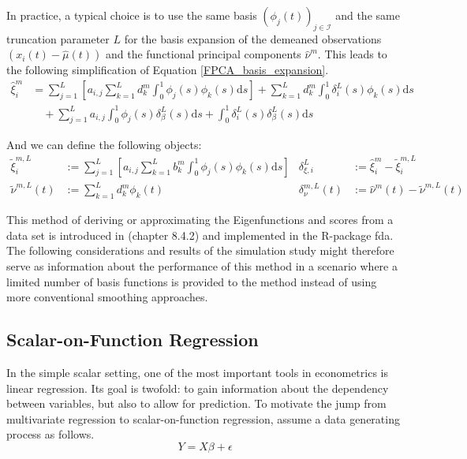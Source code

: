 \documentclass[11pt,twoside,a4paper]{article}
\begin{document}
	In practice, a typical choice is to use the same basis $\left(\phi_j(t)\right)_{j \in \mathcal{I}}$ and the same truncation parameter $L$ for the basis expansion of the demeaned observations $\left(x_i(t) - \hat{\mu}(t)\right)$ and the functional principal components $\hat{\nu}^m$. This leads to the following simplification of Equation \ref{FPCA_basis_expansion}.
	\begin{equation}\label{score_approx}
		\begin{split}
			\hat{\xi}_{i}^m &= \sum_{j = 1}^{L} \left[a_{i,j}\sum_{k = 1}^{L} d_{k}^m \int_{0}^{1} \phi_j(s) \phi_{k}(s)\mathrm{d}s \right] +  \sum_{k = 1}^{L} d_{k}^m \int_{0}^{1} \delta_i^L(s) \phi_{k}(s) \mathrm{d}s \\
			& \quad + \sum_{j = 1}^{L} a_{i,j} \int_{0}^{1}\phi_j(s) \delta_{\beta}^L(s) \mathrm{d}s + \int_{0}^{1} \delta_i^L(s) \delta_{\beta}^L(s) \mathrm{d}s
		\end{split}
	\end{equation}

	And we can define the following objects:
		\begin{align}
			\tilde{\xi}^{m,L}_{i} & := \sum_{j = 1}^{L} \left[a_{i,j}\sum_{k = 1}^{L} b_{k}^m \int_{0}^{1} \phi_j(s) \phi_{k}(s)\mathrm{d}s \right] 
			& \delta_{\xi, i}^L & := \hat{\xi}_{i}^m - \tilde{\xi}^{m,L}_{i} \\
			\tilde{\nu}^{m,L}(t) & := \sum_{k = 1}^{L} d_{k}^m \phi_{k}(t) 
			& \delta_{\nu}^{m, L}(t) & := \hat{\nu}^m(t) - \tilde{\nu}^{m,L}(t)
		\end{align}	
	
	This method of deriving or approximating the Eigenfunctions and scores from a data set is introduced in \cite{ramsay_functional_2005} (chapter 8.4.2) and implemented in the R-package fda. The following considerations and results of the simulation study might therefore serve as information about the performance of this method in a scenario where a limited number of basis functions is provided to the method instead of using more conventional smoothing approaches.
	
	\subsection{Scalar-on-Function Regression}\label{Scalar_on_function_regression}
	In the simple scalar setting, one of the most important tools in econometrics is linear regression. Its goal is twofold: to gain information about the dependency between variables, but also to allow for prediction. To motivate the jump from multivariate regression to scalar-on-function regression, assume a data generating process as follows.
	\begin{equation}
		Y = X\beta + \epsilon
	\end{equation}
	
\end{document}
